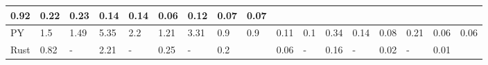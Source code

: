 \begin{table}[]
{\begin{tabular}{|l|llllllll|llllllll|}
  {\color[HTML]{666666} 0.92} &
  \multicolumn{1}{l|}{{\color[HTML]{666666} 0.22}} &
  \multicolumn{1}{l|}{{\color[HTML]{666666} 0.23}} &
  \multicolumn{1}{l|}{{\color[HTML]{666666} 0.14}} &
  \multicolumn{1}{l|}{{\color[HTML]{666666} 0.14}} &
  \multicolumn{1}{l|}{{\color[HTML]{666666} 0.06}} &
  \multicolumn{1}{l|}{{\color[HTML]{666666} 0.12}} &
  \multicolumn{1}{l|}{{\color[HTML]{666666} 0.07}} &
  {\color[HTML]{666666} 0.07} \\ \hline
{\color[HTML]{666666} PY} &
  \multicolumn{1}{l|}{{\color[HTML]{666666} 1.5}} &
  \multicolumn{1}{l|}{{\color[HTML]{666666} 1.49}} &
  \multicolumn{1}{l|}{{\color[HTML]{666666} 5.35}} &
  \multicolumn{1}{l|}{{\color[HTML]{666666} 2.2}} &
  \multicolumn{1}{l|}{{\color[HTML]{666666} 1.21}} &
  \multicolumn{1}{l|}{{\color[HTML]{666666} 3.31}} &
  \multicolumn{1}{l|}{{\color[HTML]{666666} 0.9}} &
  {\color[HTML]{666666} 0.9} &
  \multicolumn{1}{l|}{{\color[HTML]{666666} 0.11}} &
  \multicolumn{1}{l|}{{\color[HTML]{666666} 0.1}} &
  \multicolumn{1}{l|}{{\color[HTML]{666666} 0.34}} &
  \multicolumn{1}{l|}{{\color[HTML]{666666} 0.14}} &
  \multicolumn{1}{l|}{{\color[HTML]{666666} 0.08}} &
  \multicolumn{1}{l|}{{\color[HTML]{666666} 0.21}} &
  \multicolumn{1}{l|}{{\color[HTML]{666666} 0.06}} &
  {\color[HTML]{666666} 0.06} \\ \hline
{\color[HTML]{666666} Rust} &
  \multicolumn{1}{l|}{{\color[HTML]{666666} 0.82}} &
  \multicolumn{1}{l|}{{\color[HTML]{666666} -}} &
  \multicolumn{1}{l|}{{\color[HTML]{666666} 2.21}} &
  \multicolumn{1}{l|}{{\color[HTML]{666666} -}} &
  \multicolumn{1}{l|}{{\color[HTML]{666666} 0.25}} &
  \multicolumn{1}{l|}{{\color[HTML]{666666} -}} &
  \multicolumn{1}{l|}{{\color[HTML]{666666} 0.2}} &
   &
  \multicolumn{1}{l|}{{\color[HTML]{666666} 0.06}} &
  \multicolumn{1}{l|}{{\color[HTML]{666666} -}} &
  \multicolumn{1}{l|}{{\color[HTML]{666666} 0.16}} &
  \multicolumn{1}{l|}{{\color[HTML]{666666} -}} &
  \multicolumn{1}{l|}{{\color[HTML]{666666} 0.02}} &
  \multicolumn{1}{l|}{{\color[HTML]{666666} -}} &
  \multicolumn{1}{l|}{{\color[HTML]{666666} 0.01}} &
   \\ \hline
\end{tabular}%
}
\end{table}